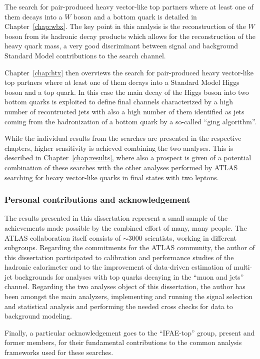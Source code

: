 The search for pair-produced heavy vector-like top partners
where at least one of them decays into a $W$ boson and a bottom
quark is detailed in Chapter~\ref{chap:wbx}. The key point in
this analysis is the reconstruction of the $W$ boson from its
hadronic decay products which allows for the reconstruction
of the heavy quark mass, a very good discriminant between
signal and background Standard Model contributions to the
search channel.

Chapter~\ref{chap:htx} then overviews the search for 
pair-produced heavy vector-like top partners
where at least one of them decays into a Standard Model Higgs
boson and a top quark. In this case the main decay of the Higgs
boson into two bottom quarks is exploited to define 
final channels characterized by a high number of recontructed
jets with also a high number of them identified as jets coming
from the hadronization of a bottom quark by a so-called
``\btag ging algorithm''.

While the individual results from the searches
are presented in the respective chapters, higher
sensitivity is achieved combining the two analyses.
This is described in Chapter~\ref{chap:results},
where also a prospect is given of a potential combination
of these searches with the other analyses performed
by ATLAS searching for heavy vector-like quarks
in final states with two leptons.






\subsubsection*{Personal contributions and acknowledgement}

The results presented in this dissertation represent
a small sample of the achievements made possible by
the combined effort of many, many people. The ATLAS
collaboration itself consists of $\sim$3000 scientists,
working in different subgroups. 
Regarding the commitments for the ATLAS community, the 
author of this dissertation participated to calibration
and performance studies of the hadronic calorimeter
and to the improvement of data-driven estimation of
multi-jet backgrounds for analyses with top quarks 
decaying in the ``muon and jets'' channel. Regarding
the two analyses object of this dissertation, the author
has been amongst the main analyzers, implementing and
running the signal selection and statistical analysis and
performing the needed cross checks for data to background
modeling.%

Finally, a particular acknowledgement goes to the ``IFAE-top''
group, present and former members, for their fundamental
contributions to the common analysis frameworks used
for these searches.
